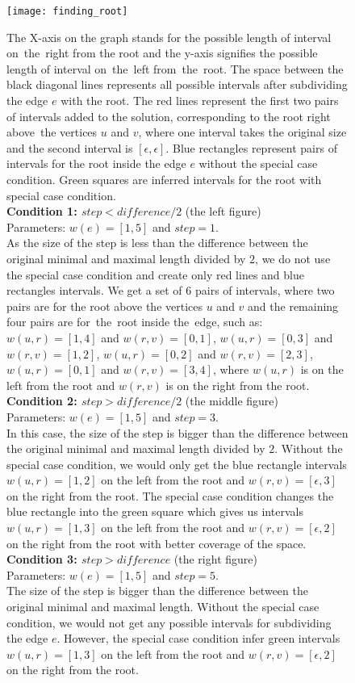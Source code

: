 \begin{figure}[!htbp]
	\centering
  	\texttt{[image: finding\_root]}
  	\caption[Rooting the gene tree]
  	{The X-axis on the graph stands for the possible length of interval on~the~right from the root and the y-axis signifies the possible length of interval on~the~left from~the~root. The space between the black diagonal lines represents all possible intervals after subdividing the edge $e$ with the root. The red lines represent the first two pairs of intervals added to the solution, corresponding to the root right above~the vertices $u$ and $v$, where one interval takes the original size and the second interval is $[\epsilon, \epsilon]$. Blue rectangles represent pairs of intervals for the root inside the edge $e$ without the special case condition. Green squares are inferred intervals for the root with special case condition. \\
\textbf{Condition 1: $step < difference / 2$} (the left figure)\\
  	Parameters: $w(e) = [1, 5]$ and $step = 1$. \\
  	As the size of the step is less than the difference between the original minimal and maximal length divided by $2$, we do not use the special case condition and create only red lines and blue rectangles intervals. We get a set of 6 pairs of intervals, where two pairs are for the root above the vertices $u$ and $v$ and the remaining four pairs are for~the~root inside the~edge, such as: $w(u, r) = [1, 4]$ and $w(r, v) = [0, 1]$, $w(u, r) = [0, 3]$ and $w(r, v) = [1, 2]$, $w(u, r) = [0, 2]$ and $w(r, v) = [2, 3]$, $w(u, r) = [0, 1]$ and $w(r, v) = [3, 4]$, where $w(u, r)$ is on the left from the root and $w(r, v)$ is on the right from the root.\\  	
  	\textbf{Condition 2: $step > difference / 2$} (the middle figure)\\
  	Parameters: $w(e) = [1, 5]$ and $step = 3$. \\
  	In this case, the size of the step is bigger than the difference between the original minimal and maximal length divided by $2$. Without the special case condition, we would only get the blue rectangle intervals $w(u,r)=[1,2]$ on the left from the root and $w(r,v)=[\epsilon, 3]$ on the right from the root. The special case condition changes the blue rectangle into the green square which gives us intervals $w(u, r) = [1, 3]$ on the left from the root and $w(r, v) = [\epsilon, 2]$ on the right from the root with better coverage of the space.\\
  	\textbf{Condition 3: $step > difference$} (the right figure)\\
  	Parameters: $w(e) = [1, 5]$ and $step = 5$. \\
  	The size of the step is bigger than the difference between the original minimal and maximal length. Without the special case condition, we would not get any possible intervals for subdividing the edge $e$. However, the special case condition infer green intervals $w(u, r) = [1, 3]$ on the left from the root and $w(r, v) = [\epsilon, 2]$ on the right from the root.}
  	\label{finding_root}
\end{figure}

